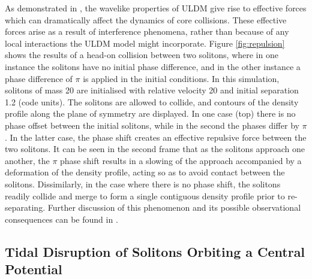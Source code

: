 \documentclass[a4paper,11pt]{article}
\begin{document}
As demonstrated in \cite{Paredes2016}, the wavelike properties of ULDM give rise to effective forces which can dramatically affect the dynamics of core collisions. These effective forces arise as a result of interference phenomena, rather than because of any local interactions the ULDM model might  incorporate.  Figure \ref{fig:repulsion} shows the results of a head-on collision between two solitons, where in one instance the solitons have no initial phase difference, and in the other instance a phase difference of $\pi$ is applied in the initial conditions. In this simulation, solitons of mass 20 are initialised with relative velocity 20 and initial separation 1.2 (code units). The solitons are allowed to collide, and contours of the density profile along the plane of symmetry are displayed. In one case (top) there is no phase offset between the initial solitons, while in the second the phases differ by $\pi$. In the latter case, the phase shift creates an effective repulsive force between the two solitons. It can be seen in the second frame that as the solitons approach one another, the $\pi$ phase shift results in a slowing of the approach accompanied by a deformation of the density profile, acting so as to avoid contact between the solitons. Dissimilarly, in the case where there is no phase shift, the solitons readily collide and merge to form a single contiguous density profile prior to re-separating. Further discussion of this phenomenon and its possible observational consequences can be found in \cite{Paredes2016}.


\vspace{1em}

\subsection{Tidal Disruption of Solitons Orbiting a Central Potential}\label{sec:disruption}
\end{document}
